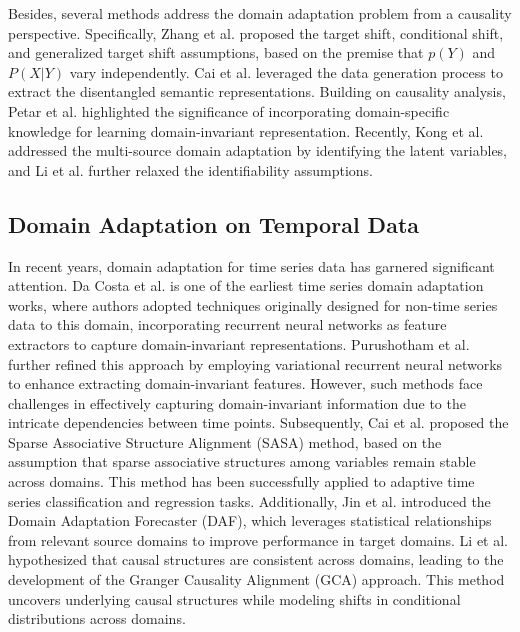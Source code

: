 Besides, several methods address the domain adaptation problem from a causality perspective. Specifically, Zhang et al. \cite{zhang2013domain} proposed the target shift, conditional shift, and generalized target shift assumptions, based on the premise that $p(Y)$ and $P(X|Y)$ vary independently. Cai et al. \cite{cai2019learning} leveraged the data generation process to extract the disentangled semantic representations. Building on causality analysis, Petar et al. \cite{stojanov2021domain} highlighted the significance of incorporating domain-specific knowledge for learning domain-invariant representation. Recently, Kong et al. \cite{kong2022partial} addressed the multi-source domain adaptation by identifying the latent variables, and Li et al. \cite{li2024subspace} further relaxed the identifiability assumptions.


\subsection{Domain Adaptation on Temporal Data}
In recent years, domain adaptation for time series data has garnered significant attention. Da Costa et al. \cite{da2020remaining} is one of the earliest time series domain adaptation works, where authors adopted techniques originally designed for non-time series data to this domain, incorporating recurrent neural networks as feature extractors to capture domain-invariant representations. Purushotham et al. \cite{purushotham2022variational} further refined this approach by employing variational recurrent neural networks \cite{chung2015recurrent} to enhance extracting domain-invariant features. However, such methods face challenges in effectively capturing domain-invariant information due to the intricate dependencies between time points.
Subsequently, Cai et al. \cite{cai2021time} proposed the Sparse Associative Structure Alignment (SASA) method, based on the assumption that sparse associative structures among variables remain stable across domains. This method has been successfully applied to adaptive time series classification and regression tasks. Additionally, Jin et al. \cite{jin2022domain} introduced the Domain Adaptation Forecaster (DAF), which leverages statistical relationships from relevant source domains to improve performance in target domains. Li et al. \cite{li2023transferable} hypothesized that causal structures are consistent across domains, leading to the development of the Granger Causality Alignment (GCA) approach. This method uncovers underlying causal structures while modeling shifts in conditional distributions across domains.

